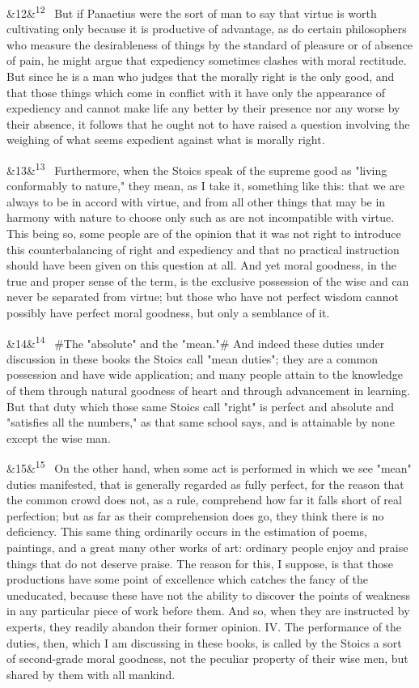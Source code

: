 \documentclass[12pt]{article}
\newcommand{\para}[1][]{\par\noindent\ifx&#1&\else\textsuperscript{\footnotesize #1}~\fi}
\begin{document}
\para[12] But if Panaetius were the sort of man to say that virtue is worth cultivating only because it is productive of advantage, as do certain philosophers who measure the desirableness of things by the standard of pleasure or of absence of pain, he might argue that expediency sometimes clashes with moral rectitude. But since he is a man who judges that the morally right is the only good, and that those things which come in conflict with it have only the appearance of expediency and cannot make life any better by their presence nor any worse by their absence, it follows that he ought not to have raised a question involving the weighing of what seems expedient against what is morally right.

\para[13] Furthermore, when the Stoics speak of the supreme good as "living conformably to nature," they mean, as I take it, something like this: that we are always to be in accord with virtue, and from all other things that may be in harmony with nature to choose only such as are not incompatible with virtue. This being so, some people are of the opinion that it was not right to introduce this counterbalancing of right and expediency and that no practical instruction should have been given on this question at all. And yet moral goodness, in the true and proper sense of the term, is the exclusive possession of the wise and can never be separated from virtue; but those who have not perfect wisdom cannot possibly have perfect moral goodness, but only a semblance of it.

\para[14] \#The "absolute" and the "mean."\# And indeed these duties under discussion in these books the Stoics call "mean duties"; they are a common possession and have wide application; and many people attain to the knowledge of them through natural goodness of heart and through advancement in learning. But that duty which those same Stoics call "right" is perfect and absolute and "satisfies all the numbers," as that same school says, and is attainable by none except the wise man.

\para[15] On the other hand, when some act is performed in which we see "mean" duties manifested, that is generally regarded as fully perfect, for the reason that the common crowd does not, as a rule, comprehend how far it falls short of real perfection; but as far as their comprehension does go, they think there is no deficiency. This same thing ordinarily occurs in the estimation of poems, paintings, and a great many other works of art: ordinary people enjoy and praise things that do not deserve praise. The reason for this, I suppose, is that those productions have some point of excellence which catches the fancy of the uneducated, because these have not the ability to discover the points of weakness in any particular piece of work before them. And so, when they are instructed by experts, they readily abandon their former opinion. IV. The performance of the duties, then, which I am discussing in these books, is called by the Stoics a sort of second-grade moral goodness, not the peculiar property of their wise men, but shared by them with all mankind.
\end{document}
